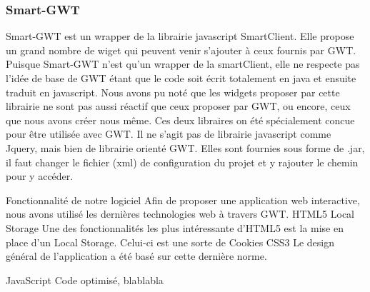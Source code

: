 \subsubsection{Smart-GWT}
Smart-GWT est un wrapper de la librairie javascript SmartClient. Elle propose un grand nombre de wiget qui peuvent venir s'ajouter à ceux fournis par GWT. Puisque Smart-GWT n'est qu'un wrapper de la smartClient, elle ne respecte pas l'idée de base de GWT étant que le code soit écrit totalement en java et ensuite traduit en javascript. Nous avons pu noté que les widgets proposer par cette librairie ne sont pas aussi réactif que ceux proposer par GWT, ou encore, ceux que nous avons créer nous même.
Ces deux libraires on été spécialement concue pour être utilisée avec GWT. Il ne s'agit pas de librairie javascript comme Jquery, mais bien de librairie orienté GWT. Elles sont fournies sous forme de .jar, il faut changer le fichier (xml) de configuration du projet et y rajouter le chemin pour y accéder.



Fonctionnalité de notre logiciel
Afin de proposer une application web interactive, nous avons utilisé les dernières technologies web à travers GWT.
HTML5
	Local Storage
Une des fonctionnalités les plus intéressante d'HTML5 est la mise en place d'un Local Storage. Celui-ci est une sorte de Cookies
	CSS3
	Le design général de l'application a été basé sur cette dernière norme.

	JavaScript
	Code optimisé, blablabla